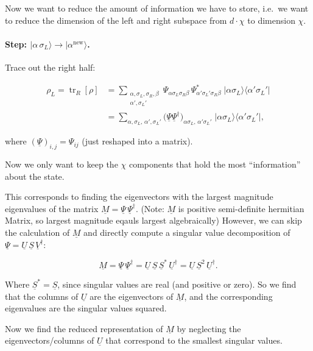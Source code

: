 Now we want to reduce the amount of information we have to store,
i.e.\ we want to reduce the dimension of the left and right subspace from $d\cdot\chi$ to
dimension $\chi$.

\paragraph{Step: $|\alpha\,\sigma_L\rangle \to |\alpha^{\mathrm{new}}\rangle$.}
Trace out the right half:

\begin{align}
\rho_L = \operatorname{tr}_R[\rho]
&= \sum_{\substack{\alpha,\sigma_L,\sigma_R,\beta\\ \alpha',\sigma_L'}}
\Psi_{\alpha\sigma_L\sigma_R\beta}\,\Psi^*_{\alpha'\sigma_L'\sigma_R\beta}\;
\big|\alpha\sigma_L\big\rangle\big\langle\alpha'\sigma_L'\big|\\
&= \sum_{\alpha,\sigma_L,\,\alpha',\sigma_L'}
\big(\underline{\Psi}\underline{\Psi}^\dagger\big)_{\alpha\sigma_L,\,\alpha'\sigma_L'}\;
\big|\alpha\sigma_L\big\rangle\big\langle\alpha'\sigma_L'\big|,
\end{align}

where $(\underline{\Psi})_{i,j} = \Psi_{ij}$ (just reshaped into a matrix).

Now we only want to keep the $\chi$ components that hold the most
``information'' about the state.

This corresponds to finding the eigenvectors with the largest
magnitude eigenvalues of the matrix $\underline{M} = \underline{\Psi}\,\underline{\Psi}^\dagger$.
(Note: $\underline{M}$ is positive semi-definite hermitian Matrix, so largest magnitude
eqauls largest algebraically)
However, we can skip the calculation of $\underline{M}$ and directly
compute a singular value decomposition of
$\underline{\Psi} = \underline{U}\,\underline{S}\,\underline{V}^\dagger$:

\begin{equation}
\underline{M} = \underline{\Psi}\,\underline{\Psi}^\dagger
= \underline{U}\,\underline{S}\,\underline{S}^*\,\underline{U}^\dagger
= \underline{U}\,\underline{S}^2\,\underline{U}^\dagger.
\end{equation}

Where $\underline{S}^*=\underline{S}$, since singular values are real (and positive or zero).
So we find that the columns of $\underline{U}$ are the eigenvectors of
$\underline{M}$, and the corresponding eigenvalues are the singular
values squared.

Now we find the reduced representation of $\underline{M}$ by
neglecting the eigenvectors/columns of $\underline{U}$ that correspond
to the smallest singular values.

